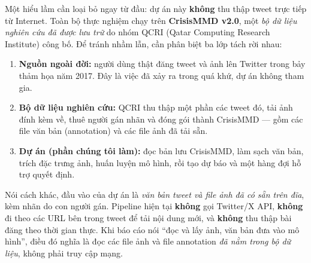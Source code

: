 Một hiểu lầm cần loại bỏ ngay từ đầu: dự án này \textbf{không} thu thập tweet
trực tiếp từ Internet. Toàn bộ thực nghiệm chạy trên \textbf{CrisisMMD v2.0}, một
\emph{bộ dữ liệu nghiên cứu đã được lưu trữ} do nhóm QCRI (Qatar Computing
Research Institute) công bố. Để tránh nhầm lẫn, cần phân biệt ba lớp tách rời
nhau:

\begin{enumerate}[leftmargin=*]
  \item \textbf{Nguồn ngoài đời:} người dùng thật đăng tweet và ảnh lên Twitter
        trong bảy thảm họa năm 2017. Đây là việc đã xảy ra trong quá khứ, dự án
        không tham gia.
  \item \textbf{Bộ dữ liệu nghiên cứu:} QCRI thu thập một phần các tweet đó, tải
        ảnh đính kèm về, thuê người gán nhãn và đóng gói thành CrisisMMD --- gồm
        các file văn bản (annotation) và các file ảnh đã tải sẵn.
  \item \textbf{Dự án (phần chúng tôi làm):} đọc bản lưu CrisisMMD, làm sạch văn
        bản, trích đặc trưng ảnh, huấn luyện mô hình, rồi tạo dự báo và một hàng
        đợi hỗ trợ quyết định.
\end{enumerate}

Nói cách khác, đầu vào của dự án là \emph{văn bản tweet và file ảnh đã có sẵn
trên đĩa}, kèm nhãn do con người gán. Pipeline hiện tại \textbf{không} gọi
Twitter/X API, \textbf{không} đi theo các URL bên trong tweet để tải nội dung
mới, và \textbf{không} thu thập bài đăng theo thời gian thực. Khi báo cáo nói
``đọc và lấy ảnh, văn bản đưa vào mô hình'', điều đó nghĩa là đọc các file ảnh và
file annotation \emph{đã nằm trong bộ dữ liệu}, không phải truy cập mạng.

